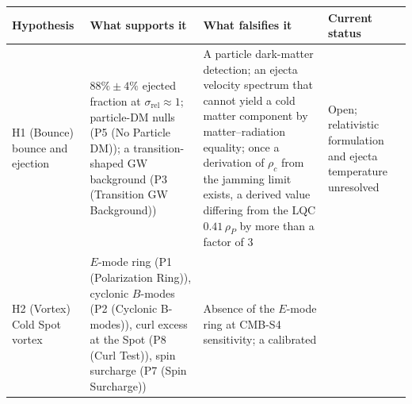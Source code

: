 \documentclass[
]{article}
\begin{document}
\begin{longtable}[]{@{}llll@{}}
\toprule
\begin{minipage}[b]{0.22\columnwidth}\raggedright
Hypothesis\strut
\end{minipage} & \begin{minipage}[b]{0.22\columnwidth}\raggedright
What supports it\strut
\end{minipage} & \begin{minipage}[b]{0.22\columnwidth}\raggedright
What falsifies it\strut
\end{minipage} & \begin{minipage}[b]{0.22\columnwidth}\raggedright
Current status\strut
\end{minipage}\tabularnewline
\midrule
\endhead
\begin{minipage}[t]{0.22\columnwidth}\raggedright
H1 (Bounce) bounce and ejection\strut
\end{minipage} & \begin{minipage}[t]{0.22\columnwidth}\raggedright
\(88\% \pm 4\%\) ejected fraction at \(\sigma_{\text{rel}} \approx 1\);
particle-DM nulls (P5 (No Particle DM)); a transition-shaped GW
background (P3 (Transition GW Background))\strut
\end{minipage} & \begin{minipage}[t]{0.22\columnwidth}\raggedright
A particle dark-matter detection; an ejecta velocity spectrum that
cannot yield a cold matter component by matter--radiation equality; once
a derivation of \(\rho_c\) from the jamming limit exists, a derived
value differing from the LQC \(0.41\,\rho_P\) by more than a factor of
\(3\)\strut
\end{minipage} & \begin{minipage}[t]{0.22\columnwidth}\raggedright
Open; relativistic formulation and ejecta temperature unresolved\strut
\end{minipage}\tabularnewline
\begin{minipage}[t]{0.22\columnwidth}\raggedright
H2 (Vortex) Cold Spot vortex\strut
\end{minipage} & \begin{minipage}[t]{0.22\columnwidth}\raggedright
\(E\)-mode ring (P1 (Polarization Ring)), cyclonic \(B\)-modes (P2
(Cyclonic B-modes)), curl excess at the Spot (P8 (Curl Test)), spin
surcharge (P7 (Spin Surcharge))\strut
\end{minipage} & \begin{minipage}[t]{0.22\columnwidth}\raggedright
Absence of the \(E\)-mode ring at CMB-S4 sensitivity; a calibrated

\end{minipage}
\end{longtable}
\end{document}

